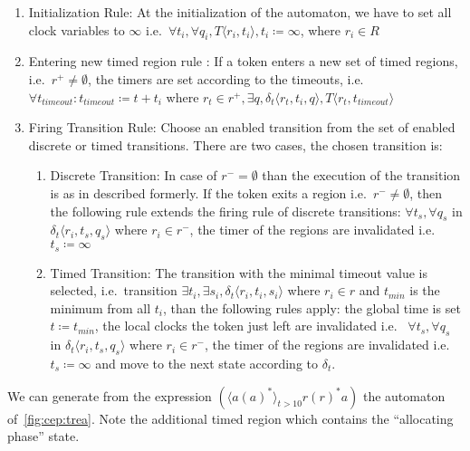 			\begin{enumerate}
				\item Initialization Rule: At the initialization  of the automaton, we have to set all clock variables to $\infty$ 
				i.e.~$\forall t_i, \forall q_i, T \langle r_i, t_i \rangle, t_i \coloneqq \infty $, where $r_i \in R$
				
				\item Entering new timed region rule :
				If a token enters a new set of timed regions, 
				i.e.~$r^+ \neq \emptyset$, 
				the timers are set according to the timeouts, 
				i.e.~$\forall t_{\textit{timeout}} : t_{\textit{timeout}} \coloneqq t + t_i $ where $ r_t \in r^+, \exists q ,\delta_t\langle  r_t,t_i,q \rangle, T \langle r_t, t_{\textit{timeout}} \rangle$
				
				\item Firing Transition Rule: Choose an enabled transition from the set of enabled discrete or timed transitions. 
				There are two cases, the chosen transition is:
				\begin{enumerate}
					\item Discrete Transition: In case of $r^- = \emptyset$ than the execution of the transition is as in described formerly. 
					If the token exits a region i.e.~$r^- \neq \emptyset$, 
					then the following rule extends the firing rule of discrete transitions:
					$\forall t_s, \forall q_s$ in $ \delta_t \langle r_i, t_s, q_s \rangle$ where $r_i \in r^-$, the timer of the regions are invalidated i.e.~	$t_s \coloneqq \infty$
					\item Timed Transition: The transition with the minimal timeout value is selected, 
					i.e.~transition $\exists t_i, \exists s_i, \delta_t \langle r_i, t_i, s_i \rangle$ where $ r_i \in r$ and $t_{\textit{min}}$ is the minimum from all $t_i$,
					than the following rules apply:
					the global time is set $t \coloneqq t_{\textit{min}}$, 
					the local clocks the token just left are invalidated i.e.~
					$\forall t_s, \forall q_s$ in $ \delta_t \langle r_i, t_s, q_s \rangle$ where $r_i \in r^-$, the timer of the regions are invalidated i.e.~$t_s \coloneqq \infty$ 
					and move to the next state according to $\delta_t$.
				\end{enumerate}			
			\end{enumerate}
			
			
			We can generate from the expression %
			$(\langle a (a)^\ast \rangle_{t > 10} r (r)^\ast a)$
			the automaton of~\cref{fig:cep:trea}.
			Note the additional timed region which contains the ``allocating phase'' state.
			
